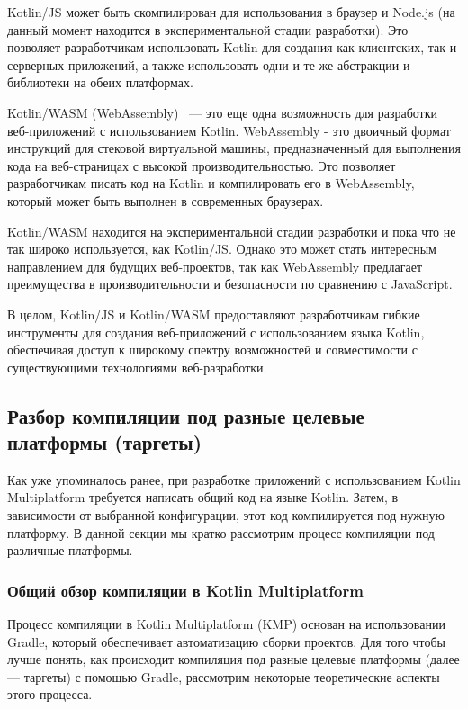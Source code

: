 \documentclass[14pt, russian]{scrartcl}
\begin{document}
Kotlin/JS может быть скомпилирован для использования в браузер и Node.js (на данный момент находится в экспериментальной стадии разработки). Это позволяет разработчикам использовать Kotlin для создания как клиентских, так и серверных приложений, а также использовать одни и те же абстракции и библиотеки на обеих платформах.

Kotlin/WASM (WebAssembly)~\cite{KotlinWASM} --- это еще одна возможность для разработки веб-приложений с использованием Kotlin. WebAssembly - это двоичный формат инструкций для стековой виртуальной машины, предназначенный для выполнения кода на веб-страницах с высокой производительностью. Это позволяет разработчикам писать код на Kotlin и компилировать его в WebAssembly, который может быть выполнен в современных браузерах.

Kotlin/WASM находится на экспериментальной стадии разработки и пока что не так широко используется, как Kotlin/JS. Однако это может стать интересным направлением для будущих веб-проектов, так как WebAssembly предлагает преимущества в производительности и безопасности по сравнению с JavaScript.

В целом, Kotlin/JS и Kotlin/WASM предоставляют разработчикам гибкие инструменты для создания веб-приложений с использованием языка Kotlin, обеспечивая доступ к широкому спектру возможностей и совместимости с существующими технологиями веб-разработки.

\subsection{Разбор компиляции под разные целевые платформы (таргеты)}

Как уже упоминалось ранее, при разработке приложений с использованием Kotlin Multiplatform требуется написать общий код на языке Kotlin. Затем, в зависимости от выбранной конфигурации, этот код компилируется под нужную платформу. В данной секции мы кратко рассмотрим процесс компиляции под различные платформы.

\subsubsection{Общий обзор компиляции в Kotlin Multiplatform}

Процесс компиляции в Kotlin Multiplatform (KMP) основан на использовании Gradle, который обеспечивает автоматизацию сборки проектов. Для того чтобы лучше понять, как происходит компиляция под разные целевые платформы (далее --- таргеты) с помощью Gradle, рассмотрим некоторые теоретические аспекты этого процесса.
\end{document}
